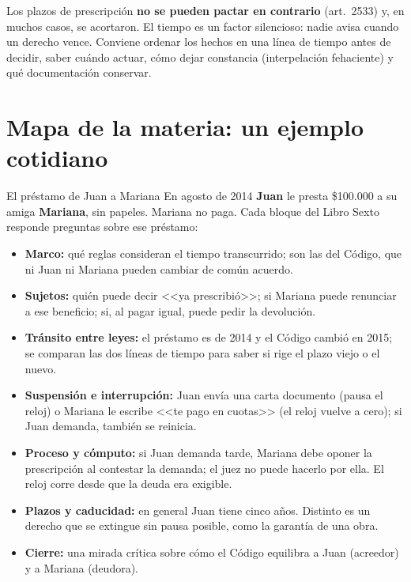 \documentclass[12pt,oneside]{book}
\begin{document}
\begin{important}
Los plazos de prescripci\'on \textbf{no se pueden pactar en contrario} (art.\ 2533) y, en muchos casos, se acortaron. El tiempo es un factor silencioso: nadie avisa cuando un derecho vence. Conviene ordenar los hechos en una l\'inea de tiempo antes de decidir, saber cu\'ando actuar, c\'omo dejar constancia (interpelaci\'on fehaciente) y qu\'e documentaci\'on conservar.
\end{important}

\section{Mapa de la materia: un ejemplo cotidiano}

\begin{example}{El pr\'estamo de Juan a Mariana}
En agosto de 2014 \textbf{Juan} le presta \$100.000 a su amiga \textbf{Mariana}, sin papeles. Mariana no paga. Cada bloque del Libro Sexto responde preguntas sobre ese pr\'estamo:
\begin{itemize}
  \item \textbf{Marco:} qu\'e reglas consideran el tiempo transcurrido; son las del C\'odigo, que ni Juan ni Mariana pueden cambiar de com\'un acuerdo.
  \item \textbf{Sujetos:} qui\'en puede decir <<ya prescribi\'o>>; si Mariana puede renunciar a ese beneficio; si, al pagar igual, puede pedir la devoluci\'on.
  \item \textbf{Tr\'ansito entre leyes:} el pr\'estamo es de 2014 y el C\'odigo cambi\'o en 2015; se comparan las dos l\'ineas de tiempo para saber si rige el plazo viejo o el nuevo.
  \item \textbf{Suspensi\'on e interrupci\'on:} Juan env\'ia una carta documento (pausa el reloj) o Mariana le escribe <<te pago en cuotas>> (el reloj vuelve a cero); si Juan demanda, tambi\'en se reinicia.
  \item \textbf{Proceso y c\'omputo:} si Juan demanda tarde, Mariana debe oponer la prescripci\'on al contestar la demanda; el juez no puede hacerlo por ella. El reloj corre desde que la deuda era exigible.
  \item \textbf{Plazos y caducidad:} en general Juan tiene cinco a\~nos. Distinto es un derecho que se extingue sin pausa posible, como la garant\'ia de una obra.
  \item \textbf{Cierre:} una mirada cr\'itica sobre c\'omo el C\'odigo equilibra a Juan (acreedor) y a Mariana (deudora).
\end{itemize}
\end{example}
\end{document}
